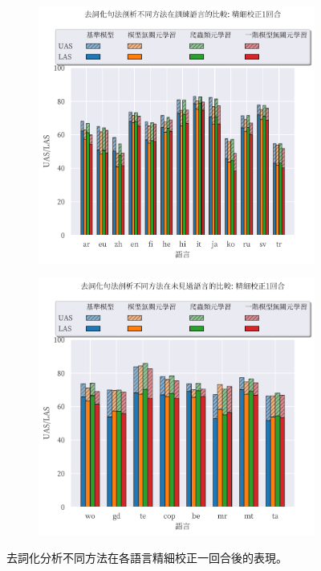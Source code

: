 \begin{figure}[!htbp]
    \centering
    \begin{subfigure}[t]{0.75\textwidth}
        \centering
        \includegraphics[width=\textwidth]{figs/chapter3/delex/bar_full_epoch_1_train_langs.pdf}
    \end{subfigure}
    \vspace{-12pt}
    \begin{subfigure}[t]{0.75\textwidth}
        \centering
        \includegraphics[width=\textwidth]{figs/chapter3/delex/bar_full_epoch_1_test_langs.pdf}
    \end{subfigure}
    \caption{去詞化分析不同方法在各語言精細校正一回合後的表現。}
    \label{fig:bar_full_epoch_1}
\end{figure}